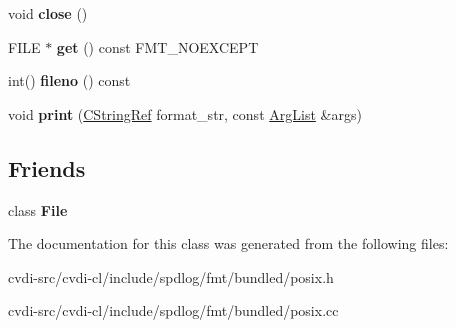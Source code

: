 \begin{DoxyCompactItemize}
\item 
void {\bfseries close} ()\hypertarget{classfmt_1_1BufferedFile_ad9b8340d0a6b638ef0ab83c7bed3d554}{}\label{classfmt_1_1BufferedFile_ad9b8340d0a6b638ef0ab83c7bed3d554}

\item 
F\+I\+LE $\ast$ {\bfseries get} () const F\+M\+T\+\_\+\+N\+O\+E\+X\+C\+E\+PT\hypertarget{classfmt_1_1BufferedFile_a2702f924d04db7f93b7512dd12ba79df}{}\label{classfmt_1_1BufferedFile_a2702f924d04db7f93b7512dd12ba79df}

\item 
int() {\bfseries fileno} () const \hypertarget{classfmt_1_1BufferedFile_a12330a2aa3b372295020e3b2d973f8ae}{}\label{classfmt_1_1BufferedFile_a12330a2aa3b372295020e3b2d973f8ae}

\item 
void {\bfseries print} (\hyperlink{classfmt_1_1BasicCStringRef}{C\+String\+Ref} format\+\_\+str, const \hyperlink{classfmt_1_1ArgList}{Arg\+List} \&args)\hypertarget{classfmt_1_1BufferedFile_aa07aa36b56d75a0e8db27d1790a8266c}{}\label{classfmt_1_1BufferedFile_aa07aa36b56d75a0e8db27d1790a8266c}

\end{DoxyCompactItemize}
\subsection*{Friends}
\begin{DoxyCompactItemize}
\item 
class {\bfseries File}\hypertarget{classfmt_1_1BufferedFile_a68d15876ad188b7628261b12d0eac8aa}{}\label{classfmt_1_1BufferedFile_a68d15876ad188b7628261b12d0eac8aa}

\end{DoxyCompactItemize}


The documentation for this class was generated from the following files\+:\begin{DoxyCompactItemize}
\item 
cvdi-\/src/cvdi-\/cl/include/spdlog/fmt/bundled/posix.\+h\item 
cvdi-\/src/cvdi-\/cl/include/spdlog/fmt/bundled/posix.\+cc\end{DoxyCompactItemize}
